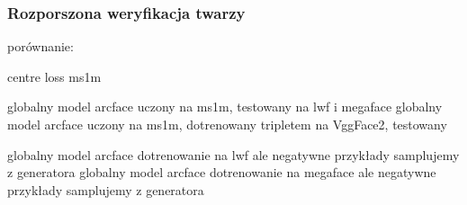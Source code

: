 \subsubsection{Rozporszona weryfikacja twarzy}
porównanie:

centre loss ms1m


globalny model arcface uczony na ms1m, testowany na lwf i megaface
globalny model arcface uczony na ms1m, dotrenowany tripletem na VggFace2, testowany


globalny model arcface dotrenowanie na lwf ale negatywne przykłady samplujemy z generatora
globalny model arcface dotrenowanie na megaface ale negatywne przykłady samplujemy z generatora




